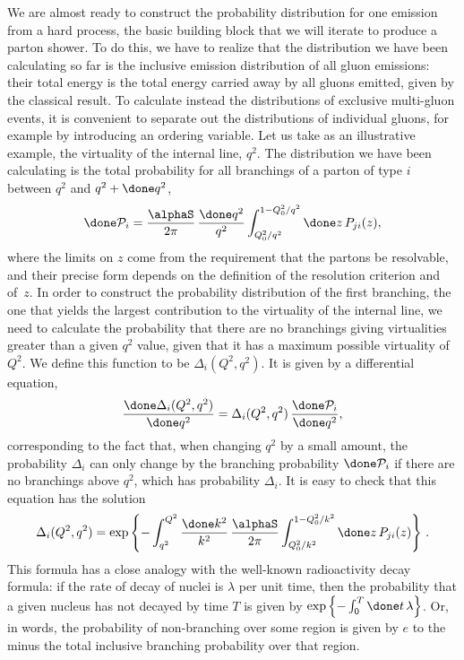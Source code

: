 We are almost ready to construct the probability distribution for one
emission from a hard process, the basic building block that we will
iterate to produce a parton shower.  To do this, we have to realize that
the distribution we have been calculating so far is the inclusive
emission distribution of all gluon emissions: their total energy is the
total energy carried away by all gluons emitted, given by the classical
result.  To calculate instead the distributions of exclusive multi-gluon
events, it is convenient to separate out the distributions of individual
gluons, for example by introducing an ordering variable.  Let us take as
an illustrative
example, the virtuality of the internal line, $q^2$.  The distribution
we have been calculating is the total probability for all branchings of
a parton of type $i$ between $q^2$ and $q^2+\done q^2$,
\begin{equation}
  \done\mathcal{P}_i=\frac{\alphaS}{2\pi}\,\frac{\done q^2}{q^2}
  \int_{Q_0^2/q^2}^{1-Q_0^2/q^2}\done z\,P_{ji}(z),
\end{equation}
where the limits on $z$ come from the requirement that the partons be
resolvable, and their precise form depends on the definition of the
resolution criterion and of~$z$.
In order to construct the probability distribution of the
first branching, \ie the one that yields the largest contribution to the
virtuality of the internal line, we need to calculate the probability
that there are no branchings giving virtualities greater than a given
$q^2$ value, given that it has a maximum possible virtuality of $Q^2$.
We define this function to be $\Delta_i(Q^2,q^2)$.  It is given by a
differential equation,
\begin{equation}
  \label{q^2distribution}
  \frac{\done\Delta_i(Q^2,q^2)}{\done q^2} = \Delta_i(Q^2,q^2)\,
  \frac{\done\mathcal{P}_i}{\done q^2},
\end{equation}
corresponding to the fact that, when changing $q^2$ by a small amount,
the probability $\Delta_i$ can only change by the branching probability
$\done\mathcal{P}_i$ if there are no branchings above $q^2$, which
has probability $\Delta_i$.  It is easy to check that this equation has
the solution
\begin{equation}
  \label{Sudakov}
  \Delta_i(Q^2,q^2) = \exp\left\{-\int_{q^2}^{Q^2}\frac{\done k^2}{k^2}\,
  \frac{\alphaS}{2\pi} \int_{Q_0^2/k^2}^{1-Q_0^2/k^2}\done z\,P_{ji}(z)
  \right\}\,.
\end{equation}
This formula has a close analogy with the well-known radioactivity decay
formula: if the rate of decay of nuclei is $\lambda$ per unit time, then
the probability that a given nucleus has not decayed by time $T$ is
given by $\exp\left\{-\int_0^T\done t\,\lambda\right\}$.  Or, in words,
the probability of non-branching over some region is given by $e$ to
the minus the total inclusive branching probability over that region.

